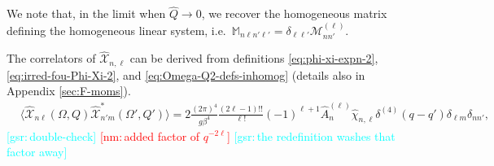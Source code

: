 \documentclass[aps,prd,preprint,nofootinbib,amsmath,amssymb,showpacs,longbibliography,singlecolumn,superscriptaddress,10pt]{revtex4-1}
\theoremstyle{plain}
\theoremstyle{definition}
\newcommand{\nm}[1]{{\textcolor{red}{[nm:\,{#1}]}}}
\newcommand{\gsr}[1]{{\textcolor{cyan}{[gsr:\,{#1}]}}}
\begin{document}
%
We note that, in the limit when $\widehat{Q} \to 0$, we recover the homogeneous matrix defining the homogeneous linear system, i.e.~$\mathds{M}_{n \ell n' \ell'} = \delta_{\ell \ell'} \mathcal{M}^{(\ell)}_{nn'}$.

The correlators of $\widehat{\mathcal{X}}_{n, \ell}$ can be derived from definitions \eqref{eq:phi-xi-expn-2}, \eqref{eq:irred-fou-Phi-Xi-2}, and \eqref{eq:Omega-Q2-defs-inhomog} (details also in Appendix \ref{sec:F-moms}).
%
\begin{equation}
\label{eq:corr-X-components}
\begin{aligned}
&
\langle \widehat{\mathcal{X}}_{n\ell}(\Omega, Q) \widehat{\mathcal{X}}^{*}_{n'm}(\Omega', Q') \rangle
=
2\frac{(2 \pi)^{4}}{g \beta^{4}} \frac{(2 \ell - 1)!!}{\ell!}
(-1)^{\ell+1}   
\widehat{A}_{n}^{(\ell)} \widehat{\chi}_{n,\ell}  \delta^{(4)}(q-q') \delta_{\ell m} \delta_{nn'},
\end{aligned}    
\end{equation}
\gsr{double-check} \nm{added factor of $q^{-2\ell}$} \gsr{the redefinition washes that factor away}
%
\end{document}
